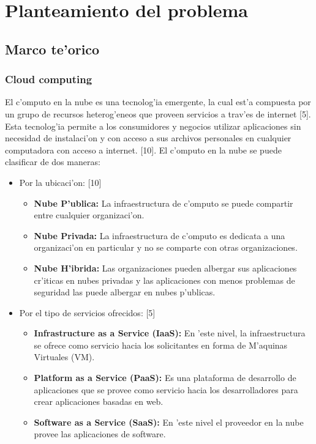 \chapter*{Planteamiento del problema}
\section*{Marco te'orico}
\subsection*{Cloud computing}


El c'omputo en la nube es una tecnolog'ia emergente, la cual est'a compuesta por un grupo de recursos heterog'eneos que proveen servicios a trav'es de internet [5].
Esta tecnolog'ia permite a los consumidores y negocios utilizar aplicaciones sin necesidad de instalaci'on y con acceso a sus archivos personales en cualquier computadora con acceso a internet. [10].
El c'omputo en la nube se puede clasificar de dos maneras:
\begin{itemize}
\item Por la ubicaci'on: [10]
	\begin{itemize}
	\item \textbf{Nube P'ublica:} La infraestructura de c'omputo se puede compartir entre cualquier organizaci'on.
	\item \textbf{Nube Privada:} La infraestructura de c'omputo es dedicata a una organizaci'on en particular y no se comparte con otras organizaciones.
	\item \textbf{Nube H'ibrida:} Las organizaciones pueden albergar sus aplicaciones cr'iticas en nubes privadas y las aplicaciones con menos problemas de seguridad las puede albergar en nubes p'ublicas.
	\end{itemize}
\item Por el tipo de servicios ofrecidos: [5]
	\begin{itemize}
	\item \textbf{Infrastructure as a Service (IaaS):} En 'este nivel, la infraestructura se ofrece como servicio hacia los solicitantes en forma de M'aquinas Virtuales (VM).
	\item \textbf{Platform as a Service (PaaS):} Es una plataforma de desarrollo de aplicaciones que se provee como servicio hacia los desarrolladores para crear aplicaciones basadas en web.
	\item \textbf{Software as a Service (SaaS):} En 'este nivel el proveedor en la nube provee las aplicaciones de software.
	\end{itemize}
\end{itemize}

